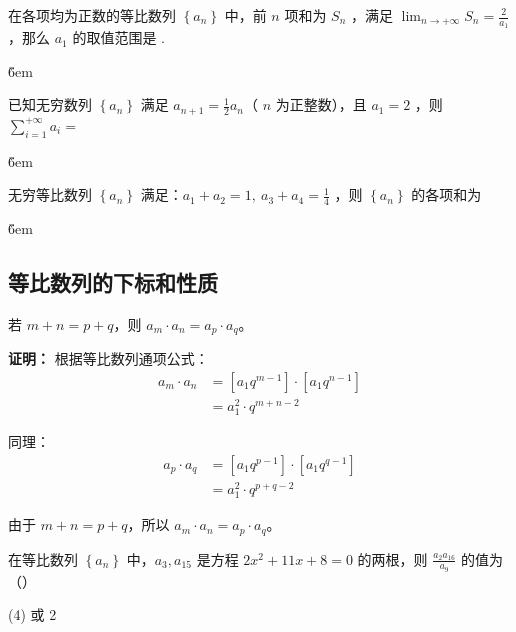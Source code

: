 \begin{example}
    在各项均为正数的等比数列 $\left\{a_n\right\}$ 中，前 $n$ 项和为 $S_n$ ，满足 $\lim _{n \rightarrow+\infty} S_n=\frac{2}{a_1}$ ，那么 $a_1$ 的取值范围是 \underline{\qquad}.
\end{example}

\v{6em}

\begin{example}
    已知无穷数列 $\left\{a_n\right\}$ 满足 $a_{n+1}=\frac{1}{2} a_n$（ $n$ 为正整数），且 $a_1=2$ ，则 $\sum_{i=1}^{+\infty} a_i=$ \underline{\qquad}
\end{example}

\v{6em}

\begin{example}
    无穷等比数列 $\left\{a_n\right\}$ 满足：$a_1+a_2=1, ~ a_3+a_4=\frac{1}{4}$ ，则 $\left\{a_n\right\}$ 的各项和为 \underline{\qquad}
\end{example}

\v{6em}

\subsection{等比数列的下标和性质}

\begin{theorem}[等比数列下标和]
    若 $m+n=p+q$，则 $a_m \cdot a_n = a_p \cdot a_q$。

    \textbf{证明：}
    根据等比数列通项公式：
    \begin{align}
        a_m \cdot a_n & = [a_1 q^{m-1}] \cdot [a_1 q^{n-1}] \\
                      & = a_1^2 \cdot q^{m+n-2}
    \end{align}

    同理：
    \begin{align}
        a_p \cdot a_q & = [a_1 q^{p-1}] \cdot [a_1 q^{q-1}] \\
                      & = a_1^2 \cdot q^{p+q-2}
    \end{align}

    由于 $m+n=p+q$，所以 $a_m \cdot a_n = a_p \cdot a_q$。

\end{theorem}

\begin{example}
    在等比数列 $\left\{a_n\right\}$ 中，$a_3, a_{15}$ 是方程 $2 x^2+11 x+8=0$ 的两根，则 $\frac{a_2 a_{16}}{a_9}$ 的值为 （\qquad）
    \begin{tasks}(4)
         或 2
    \end{tasks}
\end{example}

